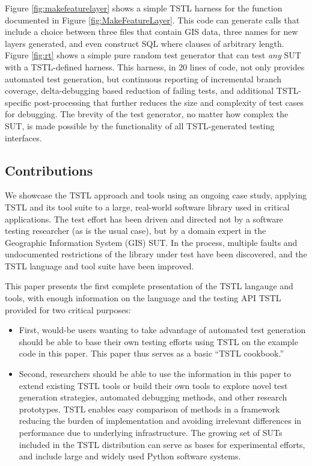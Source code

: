 Figure \ref{fig:makefeaturelayer} shows a simple TSTL harness for the
function documented in Figure \ref{fig:MakeFeatureLayer}.  This
code can generate calls that include a choice between three files that
contain GIS data, three names for new layers generated, and even
construct SQL where clauses of arbitrary length.  Figure \ref{fig:rt}
shows a simple pure random test generator that can test \emph{any} SUT
with a TSTL-defined harness.  This harness, in 20 lines of code, not
only provides automated test generation, but continuous reporting of
incremental branch coverage, delta-debugging \cite{DD}
based reduction of failing tests, and additional TSTL-specific
post-processing that further reduces the size and complexity of test
cases for debugging.  The brevity of the test generator, no matter how complex the
SUT, is made possible by the functionality of all TSTL-generated
testing interfaces.

\subsection{Contributions}

We showcase the TSTL approach and tools using an ongoing case study,
applying TSTL and its tool suite to a large, real-world software
library used in critical applications.  The test effort has been driven and directed not by a
software testing researcher (as is the usual case), but by a domain
expert in the Geographic Information System (GIS) SUT.  In the
process, multiple faults and undocumented restrictions of the library
under test have been discovered, and the TSTL language and tool suite have
been improved.

This paper presents the first complete presentation of the TSTL
langauge and tools, with enough information on the language and the
testing API TSTL provided for two critical purposes:

\begin{itemize}
\item First, would-be users wanting to take advantage of automated
  test generation should be able to base their own testing
  efforts using TSTL on the example code in this paper.
  This paper thus serves as a basic ``TSTL cookbook.''

\item Second, researchers should be able to use the information in this paper to
  extend existing TSTL tools or build their own tools to explore novel
  test generation strategies, automated debugging methods, and other
  research prototypes.  TSTL enables easy comparison of
  methods in a framework reducing the burden of implementation
  and avoiding irrelevant differences in performance due to underlying
  infrastructure.  The growing set of SUTs
  included in the TSTL distribution can serve as bases for
  experimental efforts, and include large and widely used Python
  software systems.
\end{itemize}

